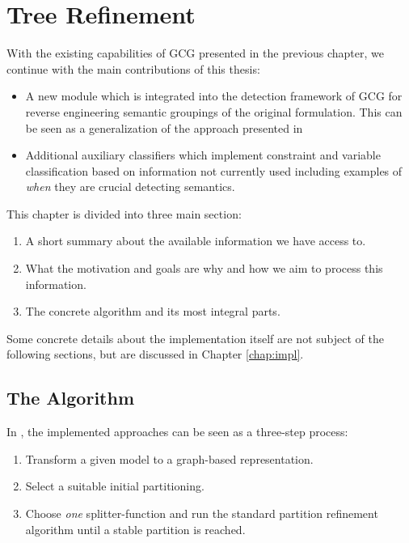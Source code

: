 \chapter{Tree Refinement}
\label{chap:tree}

	With the existing capabilities of \ac{GCG} presented in the previous chapter, we continue with the main contributions of this thesis:

	\begin{itemize}
		\item A new module which is integrated into the detection framework of \ac{GCG} for reverse engineering semantic groupings of the original formulation. This can be seen as a generalization of the approach presented in \cite{salvagninDetectingSemanticGroups2016}
		\item Additional auxiliary classifiers which implement constraint and variable classification based on information not currently used including examples of \textit{when} they are crucial detecting semantics.
	\end{itemize}

	This chapter is divided into three main section:

	\begin{enumerate}
		\item A short summary about the available information we have access to.
		\item What the motivation and goals are why and how we aim to process this information.
		\item The concrete algorithm and its most integral parts.
	\end{enumerate}

	Some concrete details about the implementation itself are not subject of the following sections, but are discussed in Chapter \ref{chap:impl}.

	\clearpage

	\section{The Algorithm}

		In \cite{salvagninDetectingSemanticGroups2016}, the implemented approaches can be seen as a three-step process:

		\begin{enumerate}
			\item Transform a given model to a graph-based representation.
			\item Select a suitable initial partitioning.
			\item Choose \textit{one} splitter-function and run the standard partition refinement algorithm until a stable partition is reached.
		\end{enumerate}


